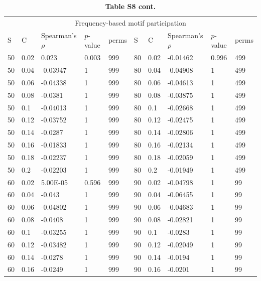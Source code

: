 \documentclass[12pt]{article}
\begin{document}
\begin{spacing}{2.0}
		\begin{table}[hb!]
			\caption*{\hspace{-13.5cm}\textbf{Table S8 cont.}}
			\footnotesize
            \begin{tabular}{l l | l l | l || ll | ll | l}
			\multicolumn{10}{c}{Frequency-based motif participation} \\
			S & C & Spearman's $\rho$ & $p$-value & perms & S & C & Spearman's $\rho$ & $p$-value & perms\\
			\hline			
            50	&	0.02	&	0.023	&	0.003	&	999	&	80	&	0.02	&	-0.01462	&	0.996	&	499	\\
            50	&	0.04	&	-0.03947	&	1	&	999	&	80	&	0.04	&	-0.04908	&	1	&	499	\\
            50	&	0.06	&	-0.04338	&	1	&	999	&	80	&	0.06	&	-0.04613	&	1	&	499	\\
            50	&	0.08	&	-0.0381	&	1	&	999	&	80	&	0.08	&	-0.03875	&	1	&	499	\\
            50	&	0.1	&	-0.04013	&	1	&	999	&	80	&	0.1	&	-0.02668	&	1	&	499	\\
            50	&	0.12	&	-0.03752	&	1	&	999	&	80	&	0.12	&	-0.02475	&	1	&	499	\\
            50	&	0.14	&	-0.0287	&	1	&	999	&	80	&	0.14	&	-0.02806	&	1	&	499	\\
            50	&	0.16	&	-0.01833	&	1	&	999	&	80	&	0.16	&	-0.02134	&	1	&	499	\\
            50	&	0.18	&	-0.02237	&	1	&	999	&	80	&	0.18	&	-0.02059	&	1	&	499	\\
            50	&	0.2	&	-0.02203	&	1	&	999	&	80	&	0.2	&	-0.01949	&	1	&	499	\\
            60	&	0.02	&	5.00E-05	&	0.596	&	999	&	90	&	0.02	&	-0.04798	&	1	&	99	\\
            60	&	0.04	&	-0.043	&	1	&	999	&	90	&	0.04	&	-0.06455	&	1	&	99	\\
            60	&	0.06	&	-0.04802	&	1	&	999	&	90	&	0.06	&	-0.04683	&	1	&	99	\\
            60	&	0.08	&	-0.0408	&	1	&	999	&	90	&	0.08	&	-0.02821	&	1	&	99	\\
            60	&	0.1	&	-0.03255	&	1	&	999	&	90	&	0.1	&	-0.0283	&	1	&	99	\\
            60	&	0.12	&	-0.03482	&	1	&	999	&	90	&	0.12	&	-0.02049	&	1	&	99	\\
            60	&	0.14	&	-0.0278	&	1	&	999	&	90	&	0.14	&	-0.0194	&	1	&	99	\\
            60	&	0.16	&	-0.0249	&	1	&	999	&	90	&	0.16	&	-0.0201	&	1	&	99	\\

\end{tabular}
\end{table}
\end{spacing}
\end{document}
